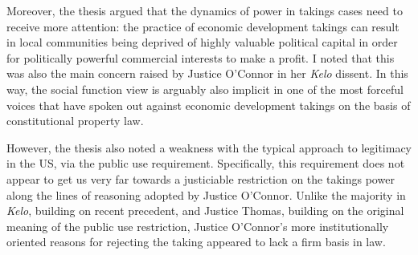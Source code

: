 {%



Moreover, the thesis argued that the dynamics of power in takings cases need to receive more attention: the practice of economic development takings can result in local communities being deprived of highly valuable political capital in order for politically powerful commercial interests to make a profit. I noted that this was also the main concern raised by Justice O'Connor in her {\it Kelo} dissent. In this way, the social function view is arguably also implicit in one of the most forceful voices that have spoken out against economic development takings on the basis of constitutional property law.

However, the thesis also noted a weakness with the typical approach to legitimacy in the US, via the public use requirement. Specifically, this requirement does not appear to get us very far towards a justiciable restriction on the takings power along the lines of reasoning adopted by Justice O'Connor. Unlike the majority in {\it Kelo}, building on recent precedent, and Justice Thomas, building on the original meaning of the public use restriction, Justice O'Connor's more institutionally oriented reasons for rejecting the taking appeared to lack a firm basis in law.

}

